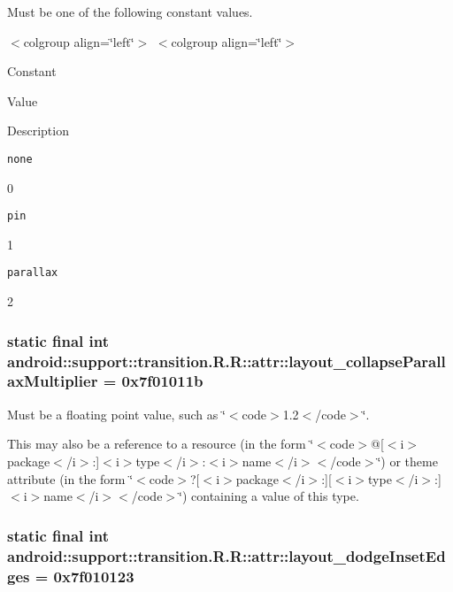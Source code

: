 Must be one of the following constant values. \begin{TabularC}{0}
\hline
\end{TabularC}
$<$colgroup align=\char`\"{}left\char`\"{}$>$ $<$colgroup align=\char`\"{}left\char`\"{}$>$ 

Constant

Value

Description 

{\tt none}

0

{\tt pin}

1

{\tt parallax}

2\hypertarget{classandroid_1_1support_1_1transition_1_1_r_1_1attr_1067c52fc6316304f5d4bd5996da38d9}{
\subsubsection[{layout\_\-collapseParallaxMultiplier}]{\setlength{\rightskip}{0pt plus 5cm}static final int android::support::transition.R.R::attr::layout\_\-collapseParallaxMultiplier = 0x7f01011b}}
\label{classandroid_1_1support_1_1transition_1_1_r_1_1attr_1067c52fc6316304f5d4bd5996da38d9}


Must be a floating point value, such as \char`\"{}$<$code$>$1.2$<$/code$>$\char`\"{}. 

This may also be a reference to a resource (in the form \char`\"{}$<$code$>$@\mbox{[}$<$i$>$package$<$/i$>$:\mbox{]}$<$i$>$type$<$/i$>$:$<$i$>$name$<$/i$>$$<$/code$>$\char`\"{}) or theme attribute (in the form \char`\"{}$<$code$>$?\mbox{[}$<$i$>$package$<$/i$>$:\mbox{]}\mbox{[}$<$i$>$type$<$/i$>$:\mbox{]}$<$i$>$name$<$/i$>$$<$/code$>$\char`\"{}) containing a value of this type. \hypertarget{classandroid_1_1support_1_1transition_1_1_r_1_1attr_07df3ebbb6c9e2ca661734d77504e44d}{
\subsubsection[{layout\_\-dodgeInsetEdges}]{\setlength{\rightskip}{0pt plus 5cm}static final int android::support::transition.R.R::attr::layout\_\-dodgeInsetEdges = 0x7f010123}}
\label{classandroid_1_1support_1_1transition_1_1_r_1_1attr_07df3ebbb6c9e2ca661734d77504e44d}


